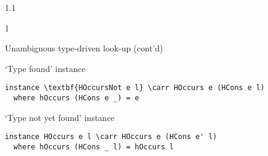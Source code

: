 \documentclass{slides}
\newenvironment{myslide}{\begin{slide}\color{Blue}\begin{boxedminipage}{1.1\hsize}\begin{boxedminipage}{1\hsize}\color{Black}
\vspace{-170\in}
}{%
\smallskip
\end{boxedminipage}
\end{boxedminipage}
\end{slide}}
\newenvironment{myslide}{\begin{slide}
}{%
\end{slide}}
\newenvironment{myslide}{\begin{slide}\color{White}\begin{boxedminipage}{1.1\hsize}\color{Black}
\vspace{-170\in}
}{%
\smallskip
\end{boxedminipage}
\end{slide}}
\newcommand{\header}[1]{{\large \color{Red} #1}}
\newcommand{\blau}[1]{{\vspace{-50\in}\normalsize \color{Blue} #1}}
\newcommand{\carr}{\ensuremath{\Rightarrow}}
\begin{document}
\begin{myslide}

\header{Unambiguous type-driven look-up (cont'd)}

\vspace{-77\in}

\blau{`Type found' instance}

\smallskip

\begin{Verbatim}[fontfamily=courier,fontsize=\small,commandchars=\\\{\}]
 instance \textbf{HOccursNot e l} \carr HOccurs e (HCons e l)
  where hOccurs (HCons e _) = e
\end{Verbatim}

\vspace{-77\in}

\blau{`Type not yet found' instance}

\smallskip

\begin{Verbatim}[fontfamily=courier,fontsize=\small,commandchars=\\\{\}]
 instance HOccurs e l \carr HOccurs e (HCons e' l)
  where hOccurs (HCons _ l) = hOccurs l
\end{Verbatim}

\end{myslide}



\end{document}
